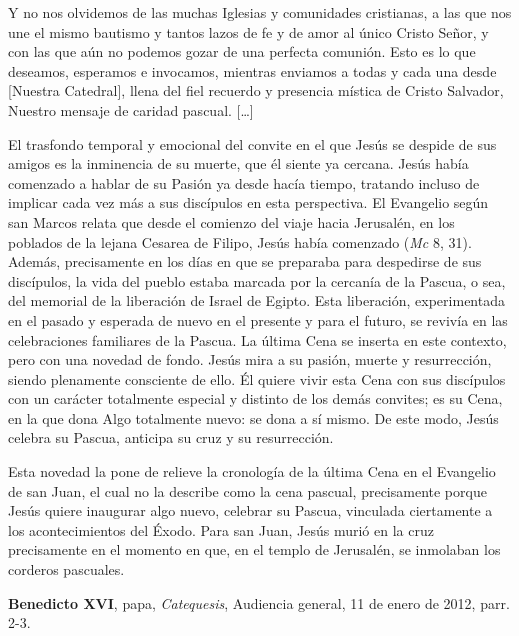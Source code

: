 
\begin{body}
Y no nos olvidemos de las muchas Iglesias y comunidades cristianas, a las que nos une el mismo bautismo y tantos lazos de fe y de amor al único Cristo Señor, y con las que aún no podemos gozar de una perfecta comunión. Esto es lo que deseamos, esperamos e invocamos, mientras enviamos a todas y cada una desde [Nuestra Catedral], llena del fiel recuerdo y presencia mística de Cristo Salvador, Nuestro mensaje de caridad pascual. [\ldots]

\end{body}

\label{b-05-01-1967H}

\begin{patercite}
El trasfondo temporal y emocional del convite en el que Jesús se despide de sus amigos es la inminencia de su muerte, que él siente ya cercana. Jesús había comenzado a hablar de su Pasión ya desde hacía tiempo, tratando incluso de implicar cada vez más a sus discípulos en esta perspectiva. El Evangelio según san Marcos relata que desde el comienzo del viaje hacia Jerusalén, en los poblados de la lejana Cesarea de Filipo, Jesús había comenzado  (\emph{Mc} 8, 31). Además, precisamente en los días en que se preparaba para despedirse de sus discípulos, la vida del pueblo estaba marcada por la cercanía de la Pascua, o sea, del memorial de la liberación de Israel de Egipto. Esta liberación, experimentada en el pasado y esperada de nuevo en el presente y para el futuro, se revivía en las celebraciones familiares de la Pascua. La última Cena se inserta en este contexto, pero con una novedad de fondo. Jesús mira a su pasión, muerte y resurrección, siendo plenamente consciente de ello. Él quiere vivir esta Cena con sus discípulos con un carácter totalmente especial y distinto de los demás convites; es su Cena, en la que dona Algo totalmente nuevo: se dona a sí mismo. De este modo, Jesús celebra su Pascua, anticipa su cruz y su resurrección.

Esta novedad la pone de relieve la cronología de la última Cena en el Evangelio de san Juan, el cual no la describe como la cena pascual, precisamente porque Jesús quiere inaugurar algo nuevo, celebrar su Pascua, vinculada ciertamente a los acontecimientos del Éxodo. Para san Juan, Jesús murió en la cruz precisamente en el momento en que, en el templo de Jerusalén, se inmolaban los corderos pascuales. 

\textbf{Benedicto XVI}, papa, \textit{Catequesis}, Audiencia general, 11 de enero de 2012, parr. 2-3.
\end{patercite}

